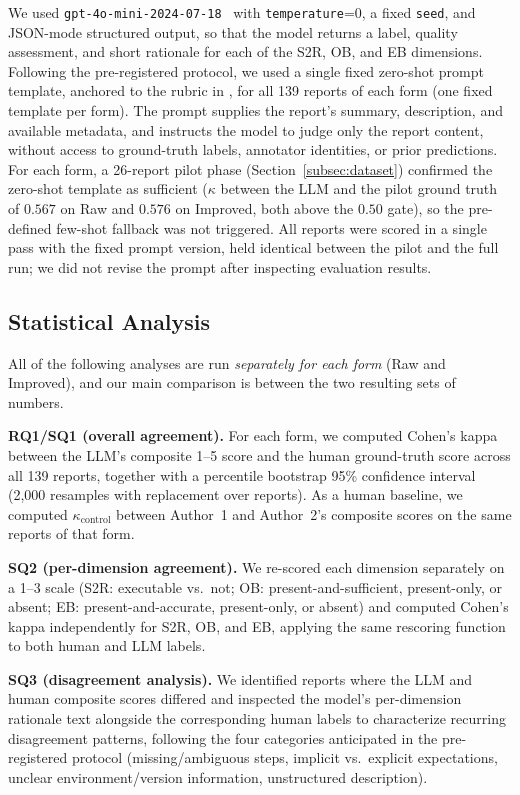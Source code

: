 We used \texttt{gpt-4o-mini-2024-07-18}~\cite{openai2024gpt4omini} with
\texttt{temperature}=0, a fixed \texttt{seed}, and JSON-mode structured
output, so that the model returns a label, quality assessment, and short
rationale for each of the S2R, OB, and EB dimensions. Following the
pre-registered protocol, we used a single fixed zero-shot prompt template,
anchored to the rubric in , for all 139 reports
of each form (one fixed template per form). The prompt supplies the report's
summary, description, and available metadata, and instructs the model to judge
only the report content, without access to ground-truth labels, annotator
identities, or prior predictions. For each form, a 26-report pilot phase
(Section~\ref{subsec:dataset}) confirmed the zero-shot template as sufficient
($\kappa$ between the LLM and the pilot ground truth of $0.567$ on Raw and
$0.576$ on Improved, both above the $0.50$ gate), so the pre-defined few-shot
fallback was not triggered. All reports were scored in a single pass with the
fixed prompt version, held identical between the pilot and the full run; we did
not revise the prompt after inspecting evaluation results.

\subsection{Statistical Analysis}
\label{subsec:stats}

All of the following analyses are run \emph{separately for each form} (Raw and
Improved), and our main comparison is between the two resulting sets of
numbers.

\textbf{RQ1/SQ1 (overall agreement).} For each form, we computed Cohen's
kappa~\cite{cohen1960coefficient} between the LLM's composite 1--5 score and
the human ground-truth score across all 139 reports, together with a
percentile bootstrap 95\% confidence interval (2{,}000 resamples with
replacement over reports). As a human baseline, we computed
$\kappa_{\text{control}}$ between Author~1 and Author~2's composite scores on
the same reports of that form.

\textbf{SQ2 (per-dimension agreement).} We re-scored each dimension
separately on a 1--3 scale (S2R: executable vs.\ not; OB: present-and-sufficient,
present-only, or absent; EB: present-and-accurate, present-only, or absent) and
computed Cohen's kappa independently for S2R, OB, and EB, applying the same
rescoring function to both human and LLM labels.

\textbf{SQ3 (disagreement analysis).} We identified reports where the LLM and
human composite scores differed and inspected the model's per-dimension
rationale text alongside the corresponding human labels to characterize
recurring disagreement patterns, following the four categories anticipated in
the pre-registered protocol (missing/ambiguous steps, implicit vs.\ explicit
expectations, unclear environment/version information, unstructured
description).

